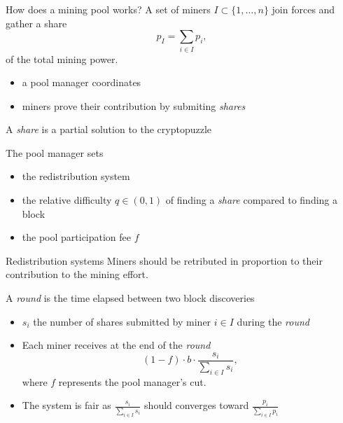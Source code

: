 \documentclass{beamer}
\begin{document}
\begin{frame}{How does a mining pool works?}
\scriptsize
A set of miners $I\subset\{1,\ldots, n\}$ join forces and gather a share 
$$
p_I = \sum_{i\in I }p_i,
$$
of the total mining power. 
\begin{itemize}
  \item a pool manager coordinates
  \item miners prove their contribution by submiting \textit{shares}  
\end{itemize}
\begin{tcolorbox}[enhanced,drop shadow, title=Definition (share)]
A \textit{share} is a partial solution to the cryptopuzzle
\end{tcolorbox}
The pool manager sets
\begin{itemize} 
  \item the redistribution system
  \item the relative difficulty $q\in(0,1)$ of finding a \textit{share} compared to finding a block
  \item the pool participation fee $f$
  \end{itemize} 
\end{frame}
\begin{frame}{Redistribution systems}
\scriptsize
Miners should be retributed in proportion to their contribution to the mining effort. 
\begin{tcolorbox}[enhanced,drop shadow, title=Proportional reward system]
A \textit{round} is the time elapsed between two block discoveries
\begin{itemize} 
  \item $s_i$ the number of shares submitted by miner $i\in I$ during the \textit{round}
  \item Each miner receives at the end of the \textit{round}
  $$
  (1-f)\cdot b\cdot\frac{s_i}{\sum_{i\in I}s_i},
  $$
  where $f$ represents the pool manager's cut.
  \item The system is fair as $\frac{s_i}{\sum_{i\in I}s_i}$ should converges toward $\frac{p_i}{\sum_{i\in I}p_i}$
\end{itemize}

\end{tcolorbox}
\end{frame}
\end{document}
